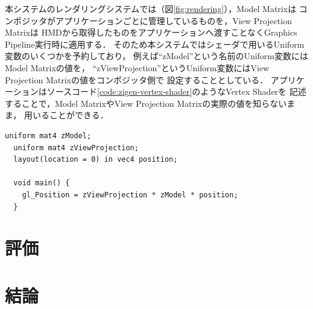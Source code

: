 本システムのレンダリングシステムでは（図\ref{fig:rendering}），Model Matrixは
コンポジッタがアプリケーションごとに管理しているものを，View Projection Matrixは
HMDから取得したものをアプリケーションへ渡すことなくGraphics Pipeline実行時に適用する．
そのため本システムではシェーダで用いるUniform変数のいくつかを予約しており，
例えば``zModel''という名前のUniform変数にはModel Matrixの値を，
``zViewProjection''というUniform変数にはView Projection Matrixの値をコンポジッタ側で
設定することとしている．
アプリケーションはソースコード\ref{code:zigen-vertex-shader}のようなVertex Shaderを
記述することで，Model MatrixやView Projection Matrixの実際の値を知らないまま，
用いることができる．

\begin{lstlisting}[caption=本システムでのVertex Shaderの例, label=code:zigen-vertex-shader]
  uniform mat4 zModel;
  uniform mat4 zViewProjection;
  layout(location = 0) in vec4 position;
  
  void main() {
    gl_Position = zViewProjection * zModel * position;
  }
\end{lstlisting}




\section{評価}


\section{結論}

